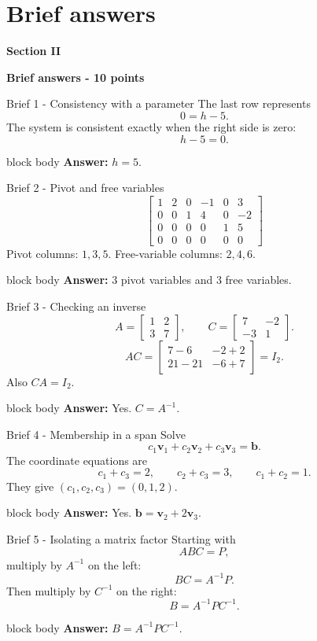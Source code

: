 \documentclass[aspectratio=169]{beamer}
\newcommand{\vect}[1]{\mathbf{#1}}
\newcommand{\sectioncard}[2]{%
  \begin{frame}[plain]
    \vfill\centering
    {\Huge\color{lectureorange}\bfseries #1}\par\bigskip
    {\LARGE\color{lecturegreen}\bfseries #2}
    \vfill
  \end{frame}}
\newcommand{\answerbox}[1]{%
  \begin{beamercolorbox}[sep=1.0ex,wd=\linewidth]{block body}
    \textbf{Answer:} #1
  \end{beamercolorbox}}
\begin{document}
\section{Brief answers}
\sectioncard{Section II}{Brief answers - 10 points}

\begin{frame}{Brief 1 - Consistency with a parameter}
The last row represents
\[
0=h-5.
\]
The system is consistent exactly when the right side is zero:
\[
h-5=0.
\]
\answerbox{$\boxed{h=5}$.}
\end{frame}

\begin{frame}{Brief 2 - Pivot and free variables}
\[
\begin{bmatrix}
\boxed{1}&2&0&-1&0&3\\
0&0&\boxed{1}&4&0&-2\\
0&0&0&0&\boxed{1}&5\\
0&0&0&0&0&0
\end{bmatrix}
\]
Pivot columns: $1,3,5$. Free-variable columns: $2,4,6$.
\answerbox{$\boxed{3}$ pivot variables and $\boxed{3}$ free variables.}
\end{frame}

\begin{frame}{Brief 3 - Checking an inverse}
\[
A=\begin{bmatrix}1&2\\3&7\end{bmatrix},
\qquad
C=\begin{bmatrix}7&-2\\-3&1\end{bmatrix}.
\]
\[
AC=
\begin{bmatrix}
7-6&-2+2\\
21-21&-6+7
\end{bmatrix}
=I_2.
\]
Also $CA=I_2$.
\answerbox{Yes. $C=A^{-1}$.}
\end{frame}

\begin{frame}{Brief 4 - Membership in a span}
Solve
\[
c_1\vect v_1+c_2\vect v_2+c_3\vect v_3=\vect b.
\]
The coordinate equations are
\[
c_1+c_3=2,
\qquad
c_2+c_3=3,
\qquad
c_1+c_2=1.
\]
They give $(c_1,c_2,c_3)=(0,1,2)$.
\answerbox{Yes. $\vect b=\vect v_2+2\vect v_3$.}
\end{frame}

\begin{frame}{Brief 5 - Isolating a matrix factor}
Starting with
\[
ABC=P,
\]
multiply by $A^{-1}$ on the left:
\[
BC=A^{-1}P.
\]
Then multiply by $C^{-1}$ on the right:
\[
B=A^{-1}PC^{-1}.
\]
\answerbox{$\boxed{B=A^{-1}PC^{-1}}$.}
\end{frame}
\end{document}
